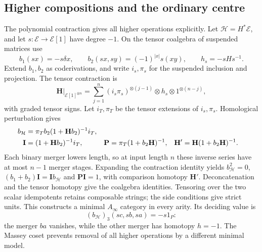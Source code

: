 \subsection{Higher compositions and the ordinary centre}

The polynomial contraction gives all higher operations explicitly.
Let $\mathcal H=H^*\mathscr E$, and let
$s:\mathscr E\to\mathscr E[1]$ have degree $-1$. On the tensor
coalgebra of suspended matrices use
\[
 b_1(sx)=-s\delta x,\qquad
 b_2(sx,sy)=(-1)^{|x|}s(xy),\qquad h_s=-sHs^{-1}.
\]
Extend $b_1,b_2$ as coderivations, and write $i_s,\pi_s$ for
the suspended inclusion and projection. The tensor contraction is
\[
 \mathbf H|_{\mathscr E[1]^{\otimes n}}
 =\sum_{j=1}^n(i_s\pi_s)^{\otimes(j-1)}\otimes h_s
                                \otimes1^{\otimes(n-j)},
\]
with graded tensor signs. Let $i_T,\pi_T$ be the tensor extensions
of $i_s,\pi_s$.
Homological perturbation gives
\begin{align}\label{eq:vol2-root-ainfinity}
 b_{\mathcal H}&=\pi_Tb_2(1+\mathbf Hb_2)^{-1}i_T,\notag\\
 \mathbf I&=(1+\mathbf Hb_2)^{-1}i_T,&
 \mathbf P&=\pi_T(1+b_2\mathbf H)^{-1},&
 \mathbf H'&=\mathbf H(1+b_2\mathbf H)^{-1}.
\end{align}
Each binary merger lowers length, so at input length $n$ these
inverse series have at most $n-1$ merger stages. Expanding the
contraction identity yields $b_{\mathcal H}^2=0$,
$(b_1+b_2)\mathbf I=\mathbf I b_{\mathcal H}$ and
$\mathbf P\mathbf I=1$, with comparison homotopy $\mathbf H'$.
Deconcatenation and the tensor homotopy give the coalgebra
identities. Tensoring over the two scalar idempotents retains
composable strings; the side conditions give strict units.
This constructs a minimal $A_\infty$ category in every arity.
Its deciding value is
\[
 (b_{\mathcal H})_3(sc,sb,sa)=-s1_P:
\]
the merger $ba$ vanishes, while the other merger has homotopy
$h=-1$. The Massey coset prevents removal of all higher
operations by a different minimal model.

